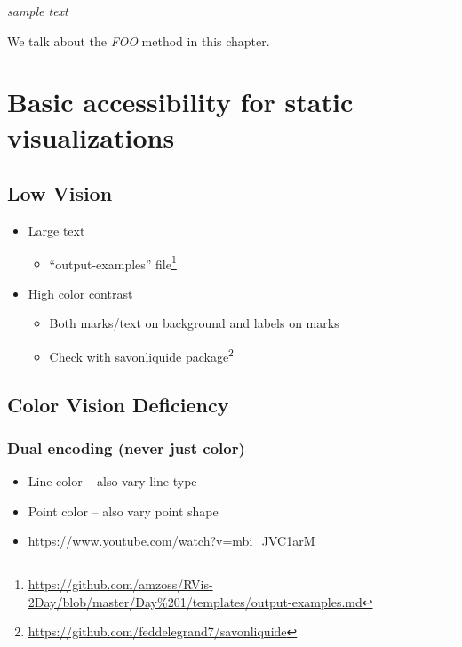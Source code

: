 \documentclass[
]{krantz}
\providecommand{\tightlist}{%
  \setlength{\itemsep}{0pt}\setlength{\parskip}{0pt}}
\renewcommand{\href}[2]{#2\footnote{\url{#1}}}
\begin{document}
\emph{sample text}

We talk about the \emph{FOO} method in this chapter.

\hypertarget{accessibility-for-visualizations}{%
\chapter{Basic accessibility for static visualizations}\label{accessibility-for-visualizations}}

\hypertarget{low-vision}{%
\section{Low Vision}\label{low-vision}}

\begin{itemize}
\item
  Large text

  \begin{itemize}
  \tightlist
  \item
    \href{https://github.com/amzoss/RVis-2Day/blob/master/Day\%201/templates/output-examples.md}{``output-examples'' file}
  \end{itemize}
\item
  High color contrast

  \begin{itemize}
  \item
    Both marks/text on background and labels on marks
  \item
    Check with \href{https://github.com/feddelegrand7/savonliquide}{savonliquide package}
  \end{itemize}
\end{itemize}

\hypertarget{color-vision-deficiency}{%
\section{Color Vision Deficiency}\label{color-vision-deficiency}}

\hypertarget{dual-encoding-never-just-color}{%
\subsection{Dual encoding (never just color)}\label{dual-encoding-never-just-color}}

\begin{itemize}
\item
  Line color -- also vary line type
\item
  Point color -- also vary point shape
\item
  \url{https://www.youtube.com/watch?v=mbi_JVC1arM}
\end{itemize}
\end{document}
